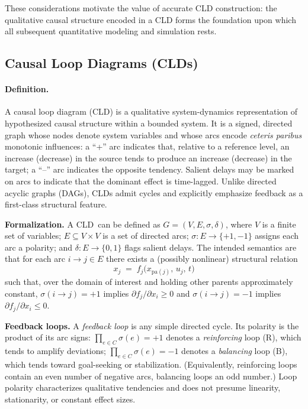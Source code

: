 \noindent
These considerations motivate the value of accurate CLD construction: the qualitative causal structure encoded in a CLD forms the foundation upon which all subsequent quantitative modeling and simulation rests.

\subsection{Causal Loop Diagrams (CLDs)}
\label{sec:background_clds}

\newcommand{\CLD}{CLD}
\paragraph{Definition.}
A causal loop diagram (\CLD) is a qualitative system-dynamics representation of hypothesized causal structure within a bounded system. It is a signed, directed graph whose nodes denote system variables and whose arcs encode \emph{ceteris paribus} monotonic influences: a \enquote{+} arc indicates that, relative to a reference level, an increase (decrease) in the source tends to produce an increase (decrease) in the target; a \enquote{--} arc indicates the opposite tendency. Salient delays may be marked on arcs to indicate that the dominant effect is time-lagged. Unlike directed acyclic graphs (DAGs), CLDs admit cycles and explicitly emphasize feedback as a first-class structural feature.

\medskip
\noindent
\textbf{Formalization.} A \CLD\ can be defined as \(G=(V,E,\sigma,\delta)\), where \(V\) is a finite set of variables; \(E\subseteq V\times V\) is a set of directed arcs; \(\sigma:E\to\{+1,-1\}\) assigns each arc a polarity; and \(\delta:E\to\{0,1\}\) flags salient delays. The intended semantics are that for each arc \(i\!\to\!j\in E\) there exists a (possibly nonlinear) structural relation
\[
x_j \;=\; f_j\!\bigl(x_{\mathrm{pa}(j)},\,u_j,\,t\bigr)
\]
such that, over the domain of interest and holding other parents approximately constant, \(\sigma(i\!\to\!j)=+1\) implies \(\partial f_j/\partial x_i \ge 0\) and \(\sigma(i\!\to\!j)=-1\) implies \(\partial f_j/\partial x_i \le 0\).

\medskip
\noindent
\textbf{Feedback loops.} A \emph{feedback loop} is any simple directed cycle. Its polarity is the product of its arc signs: \(\prod_{e\in C}\sigma(e)=+1\) denotes a \emph{reinforcing} loop (R), which tends to amplify deviations; \(\prod_{e\in C}\sigma(e)=-1\) denotes a \emph{balancing} loop (B), which tends toward goal-seeking or stabilization. (Equivalently, reinforcing loops contain an even number of negative arcs, balancing loops an odd number.) Loop polarity characterizes qualitative tendencies and does not presume linearity, stationarity, or constant effect sizes.

